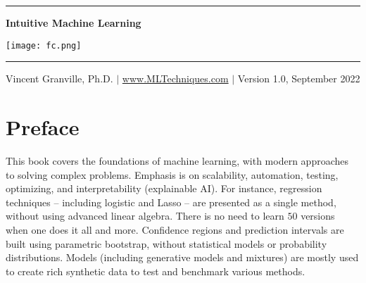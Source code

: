 \documentclass[oneside,10pt]{book}
\begin{document}
\hypersetup{linkcolor=blue}



\baselineskip
\thispagestyle{empty}
\hspace{0pt}
\vfill
\begin{center}
\rule{0.75\textwidth}{.4pt}
\end{center}

\begin{center}
{\Huge \bf{Intuitive Machine Learning} }
\end{center}


\baselineskip
\addvspace{1cm}
\begin{center}
\texttt{[image: fc.png]}
\end{center}
\addvspace{1cm}
\begin{center}
\rule{0.75\textwidth}{.4pt}
\end{center}
\begin{center}
Vincent Granville, Ph.D. $|$ \href{https://mltechniques.com/}{www.MLTechniques.com} $|$ Version 1.0, September 2022
\end{center}

\hypersetup{linkcolor=red} %

\vfill
\hspace{0pt}
\pagebreak

\chapter*{Preface} %

This book covers the foundations of machine learning, with modern approaches to solving complex problems. Emphasis is on scalability, automation, testing, optimizing, and interpretability (explainable AI). For instance, regression techniques -- including logistic and Lasso -- are presented as a single method, without using advanced linear algebra. There is no need to learn $50$ versions when one does it all and more. Confidence regions and prediction intervals are built using parametric bootstrap, without statistical models or probability distributions. Models (including generative models and mixtures) are mostly used to create rich synthetic data to test and benchmark various methods.
\end{document}

